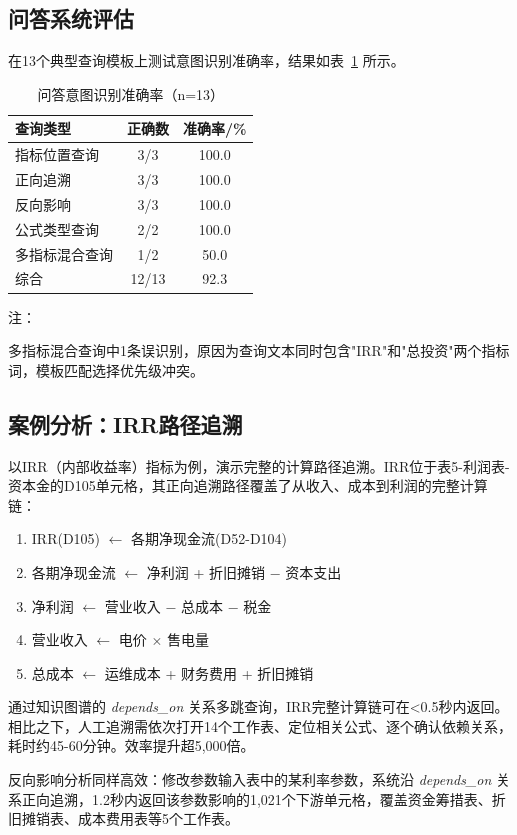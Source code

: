 \subsection{\heiti 问答系统评估}

在13个典型查询模板上测试意图识别准确率，结果如表~\ref{tab:qa_eval} 所示。

\begin{table}[H]
	\centering
	\caption{问答意图识别准确率（n=13）}
	\label{tab:qa_eval}
	\vspace {-2.5mm}
	\begin{center}
		\begin{tabular}{lcc}
			\toprule
			查询类型 & 正确数 & 准确率/\% \\
			\hline
			指标位置查询 & 3/3 & 100.0 \\
			正向追溯 & 3/3 & 100.0 \\
			反向影响 & 3/3 & 100.0 \\
			公式类型查询 & 2/2 & 100.0 \\
			多指标混合查询 & 1/2 & 50.0 \\
			\hline
			综合 & 12/13 & 92.3 \\
			\bottomrule
		\end{tabular}
	\end{center}
	\begin{center}
		\parbox{110mm}{\heiti 注：} {多指标混合查询中1条误识别，原因为查询文本同时包含"IRR"和"总投资"两个指标词，模板匹配选择优先级冲突。}
	\end{center}
\end{table}

\subsection{\heiti 案例分析：IRR路径追溯}

以IRR（内部收益率）指标为例，演示完整的计算路径追溯。IRR位于表5-利润表-资本金的D105单元格，其正向追溯路径覆盖了从收入、成本到利润的完整计算链：

\begin{enumerate}
	\item IRR(D105) $\leftarrow$ 各期净现金流(D52-D104)
	\item 各期净现金流 $\leftarrow$ 净利润 + 折旧摊销 $-$ 资本支出
	\item 净利润 $\leftarrow$ 营业收入 $-$ 总成本 $-$ 税金
	\item 营业收入 $\leftarrow$ 电价 $\times$ 售电量
	\item 总成本 $\leftarrow$ 运维成本 + 财务费用 + 折旧摊销
\end{enumerate}

通过知识图谱的 \textit{depends\_on} 关系多跳查询，IRR完整计算链可在<0.5秒内返回。相比之下，人工追溯需依次打开14个工作表、定位相关公式、逐个确认依赖关系，耗时约45-60分钟。效率提升超5,000倍。

反向影响分析同样高效：修改参数输入表中的某利率参数，系统沿 \textit{depends\_on} 关系正向追溯，1.2秒内返回该参数影响的1,021个下游单元格，覆盖资金筹措表、折旧摊销表、成本费用表等5个工作表。
